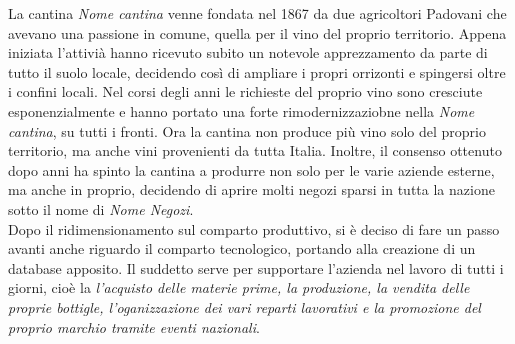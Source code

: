 La cantina \emph{Nome cantina} venne fondata nel 1867 da due agricoltori Padovani che avevano una passione in comune, quella per il vino del proprio territorio. Appena iniziata l'attivià hanno ricevuto subito un notevole apprezzamento da parte di tutto il suolo locale, decidendo così di ampliare i propri orrizonti e spingersi oltre i confini locali. Nel corsi degli anni le richieste del proprio vino sono cresciute esponenzialmente e hanno portato una forte rimodernizzaziobne nella \emph{Nome cantina}, su tutti i fronti. Ora la cantina non produce più vino solo del proprio territorio, ma anche vini provenienti da tutta Italia. Inoltre, il consenso ottenuto dopo anni ha spinto la cantina a produrre non solo per le varie aziende esterne, ma anche in proprio, decidendo di aprire molti negozi sparsi in tutta la nazione sotto il nome di \emph{Nome Negozi}.\\
Dopo il ridimensionamento sul comparto produttivo, si è deciso di fare un passo avanti anche riguardo il comparto tecnologico, portando alla creazione di un database apposito. Il suddetto serve per supportare l'azienda nel lavoro di tutti i giorni, cioè la \emph{l'acquisto delle materie prime, la produzione, la vendita delle proprie bottigle, l'oganizzazione dei vari reparti lavorativi e la promozione del proprio marchio tramite eventi nazionali}.